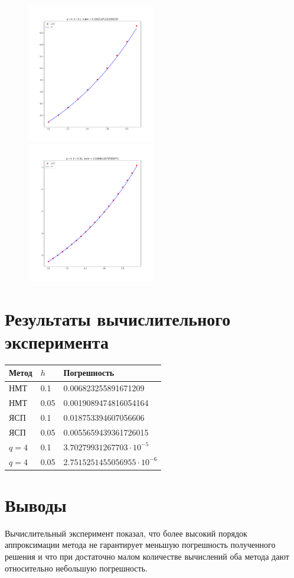 \documentclass{article}
\begin{document}
\begin{figure}[H]
\includegraphics[width=0.5\textwidth]{Figure_5.png}
\includegraphics[width=0.5\textwidth]{Figure_6.png}
\end{figure}

\section*{Результаты вычислительного эксперимента}
\begin{tabular}[H]{|l|l|l|}
  \hline
  Метод & $h$ & Погрешность \\
  \hline
  НМТ &   0.1         &    0.006823255891671209 \\
  НМТ &   0.05        & 0.0019089474816054164    \\
  ЯСП &   0.1         &  0.018753394607056606   \\
  ЯСП &   0.05        &   0.0055659439361726015  \\
  $   q=4 $    & 0.1  & $3.70279931267703 \cdot 10^{-5}$  \\
  $   q=4 $    & 0.05 &  $2.7515251455056955 \cdot 10^{-6}$ \\
  \hline
\end{tabular} 
\section*{Выводы}
Вычислительный эксперимент показал, что более высокий порядок аппроксимации
метода не гарантирует меньшую погрешность полученного решения и что при
достаточно малом количестве вычислений оба метода дают относительно небольшую
погрешность.
\end{document}
